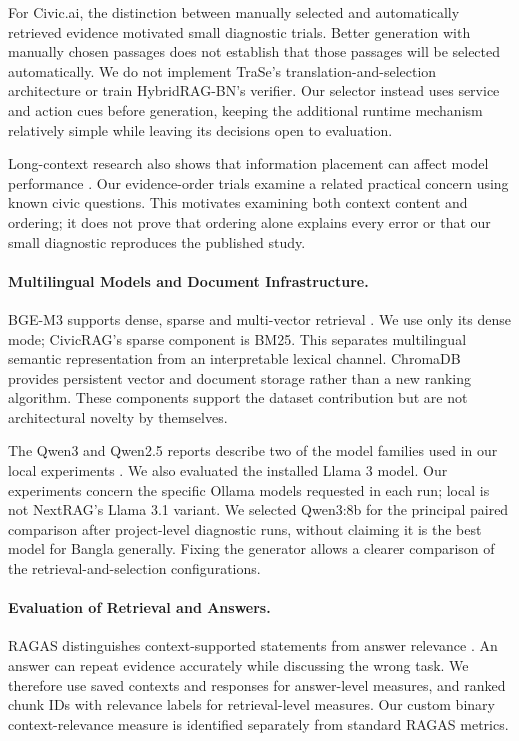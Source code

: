 For Civic.ai, the distinction between manually selected and automatically retrieved evidence motivated small diagnostic trials. Better generation with manually chosen passages does not establish that those passages will be selected automatically. We do not implement TraSe's translation-and-selection architecture or train HybridRAG-BN's verifier. Our selector instead uses service and action cues before generation, keeping the additional runtime mechanism relatively simple while leaving its decisions open to evaluation.

Long-context research also shows that information placement can affect model performance \cite{lostmiddle}. Our evidence-order trials examine a related practical concern using known civic questions. This motivates examining both context content and ordering; it does not prove that ordering alone explains every error or that our small diagnostic reproduces the published study.

\paragraph{Multilingual Models and Document Infrastructure.}
BGE-M3 supports dense, sparse and multi-vector retrieval \cite{bgem3}. We use only its dense mode; CivicRAG's sparse component is BM25. This separates multilingual semantic representation from an interpretable lexical channel. ChromaDB provides persistent vector and document storage rather than a new ranking algorithm. These components support the dataset contribution but are not architectural novelty by themselves.

The Qwen3 and Qwen2.5 reports describe two of the model families used in our local experiments \cite{qwen3,qwen25}. We also evaluated the installed Llama 3 model. Our experiments concern the specific Ollama models requested in each run; local  is not NextRAG's Llama 3.1 variant. We selected Qwen3:8b for the principal paired comparison after project-level diagnostic runs, without claiming it is the best model for Bangla generally. Fixing the generator allows a clearer comparison of the retrieval-and-selection configurations.

\paragraph{Evaluation of Retrieval and Answers.}
RAGAS distinguishes context-supported statements from answer relevance \cite{ragas}. An answer can repeat evidence accurately while discussing the wrong task. We therefore use saved contexts and responses for answer-level measures, and ranked chunk IDs with relevance labels for retrieval-level measures. Our custom binary context-relevance measure is identified separately from standard RAGAS metrics.

